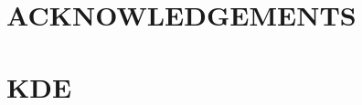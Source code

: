 \documentclass[letterpaper,useAMS,usenatbib]{mn2e}
\begin{document}
\section{ACKNOWLEDGEMENTS}




\appendix
\section{KDE}
\clearpage\bsp\label{lastpage} 
\end{document}
